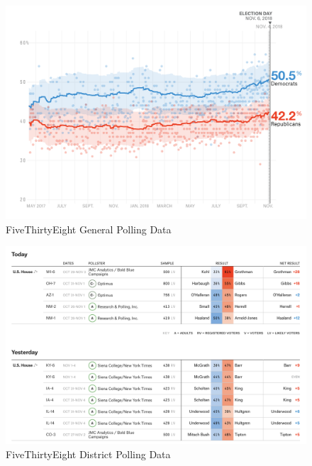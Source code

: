 \documentclass[11pt]{article}
\begin{document}
 \begin{figure}[tbh]
  \centering
  \includegraphics[scale=0.45]{general_polling}
  \caption{FiveThirtyEight General Polling Data}
  \label{fig:genpolls}
\end{figure}

 \begin{figure}[tbh]
  \centering
  \includegraphics[scale=0.4]{district_polls}
  \caption{FiveThirtyEight District Polling Data}
  \label{fig:distpolls}
\end{figure}
\end{document}
